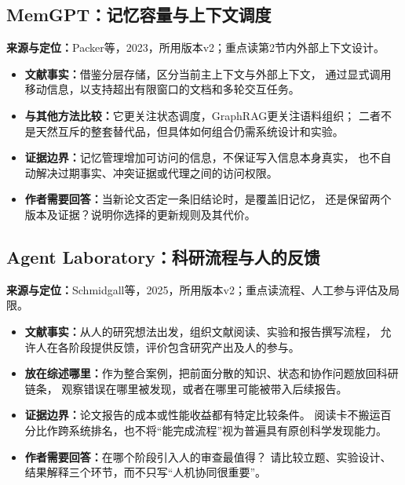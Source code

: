 \documentclass[UTF8,fontset=fandol,12pt,a4paper]{ctexart}
\begin{document}
\subsection{MemGPT：记忆容量与上下文调度}
\noindent\textbf{来源与定位：}Packer等，2023，所用版本v2；重点读第2节内外部上下文设计\cite{memgpt}。
\begin{itemize}
\item \textbf{文献事实：}借鉴分层存储，区分当前主上下文与外部上下文，
通过显式调用移动信息，以支持超出有限窗口的文档和多轮交互任务。
\item \textbf{与其他方法比较：}它更关注状态调度，GraphRAG更关注语料组织；
二者不是天然互斥的整套替代品，但具体如何组合仍需系统设计和实验。
\item \textbf{证据边界：}记忆管理增加可访问的信息，不保证写入信息本身真实，
也不自动解决过期事实、冲突证据或代理之间的访问权限。
\item \textbf{作者需要回答：}当新论文否定一条旧结论时，是覆盖旧记忆，
还是保留两个版本及证据？说明你选择的更新规则及其代价。
\end{itemize}

\subsection{Agent Laboratory：科研流程与人的反馈}
\noindent\textbf{来源与定位：}Schmidgall等，2025，所用版本v2；重点读流程、人工参与评估及局限\cite{lab}。
\begin{itemize}
\item \textbf{文献事实：}从人的研究想法出发，组织文献阅读、实验和报告撰写流程，
允许人在各阶段提供反馈，评价包含研究产出及人的参与。
\item \textbf{放在综述哪里：}作为整合案例，把前面分散的知识、状态和协作问题放回科研链条，
观察错误在哪里被发现，或者在哪里可能被带入后续报告。
\item \textbf{证据边界：}论文报告的成本或性能收益都有特定比较条件。
阅读卡不搬运百分比作跨系统排名，也不将“能完成流程”视为普遍具有原创科学发现能力。
\item \textbf{作者需要回答：}在哪个阶段引入人的审查最值得？
请比较立题、实验设计、结果解释三个环节，而不只写“人机协同很重要”。
\end{itemize}

\clearpage
\end{document}
